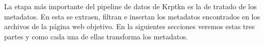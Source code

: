 La etapa más importante del pipeline de datos de Krptkn es la de tratado de los metadatos. En esta se extraen, filtran e insertan los metadatos encontrados en los archivos de la página web objetivo. En la siguientes secciones veremos estas tres partes y como cada una de ellas transforma los metadatos.